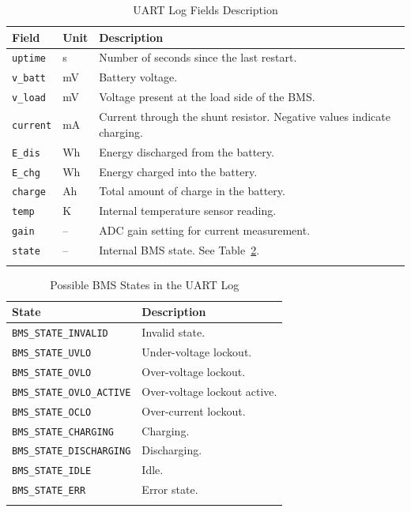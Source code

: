 \documentclass[11pt]{datasheet}
\begin{document}
\begin{table}[!ht]
\centering
\caption{UART Log Fields Description}
\begin{tabularx}{\textwidth}{l|l|X}
\thickhline
\textbf{Field} & \textbf{Unit} & \textbf{Description} \\
\hline
\texttt{uptime}     & s        & Number of seconds since the last restart. \\
\texttt{v\_batt}    & mV       & Battery voltage. \\
\texttt{v\_load}    & mV       & Voltage present at the load side of the BMS. \\
\texttt{current}    & mA       & Current through the shunt resistor. Negative values indicate charging. \\
\texttt{E\_dis}     & Wh       & Energy discharged from the battery. \\
\texttt{E\_chg}     & Wh       & Energy charged into the battery. \\
\texttt{charge}     & Ah       & Total amount of charge in the battery. \\
\texttt{temp}       & K        & Internal temperature sensor reading. \\
\texttt{gain}       & –        & ADC gain setting for current measurement. \\
\texttt{state}      & –        & Internal BMS state. See Table~\ref{tab:bms-states}. \\
\thickhline
\end{tabularx}
\label{tab:uart-fields}
\end{table}

\begin{table}[!ht]
\centering
\caption{Possible BMS States in the UART Log}
\begin{tabularx}{\textwidth}{l|X}
\thickhline
\textbf{State} & \textbf{Description} \\
\hline
\texttt{BMS\_STATE\_INVALID}      & Invalid state. \\
\texttt{BMS\_STATE\_UVLO}         & Under-voltage lockout. \\
\texttt{BMS\_STATE\_OVLO}         & Over-voltage lockout. \\
\texttt{BMS\_STATE\_OVLO\_ACTIVE} & Over-voltage lockout active. \\
\texttt{BMS\_STATE\_OCLO}         & Over-current lockout. \\
\texttt{BMS\_STATE\_CHARGING}     & Charging. \\
\texttt{BMS\_STATE\_DISCHARGING}  & Discharging. \\
\texttt{BMS\_STATE\_IDLE}         & Idle. \\
\texttt{BMS\_STATE\_ERR}          & Error state. \\
\thickhline
\end{tabularx}
\label{tab:bms-states}
\end{table}
\end{document}
